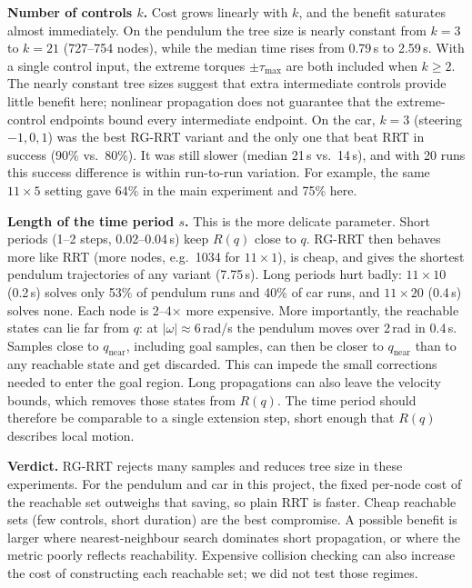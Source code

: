\documentclass[10pt,letterpaper]{article}
\begin{document}
\textbf{Number of controls $k$.} Cost grows linearly with $k$, and the benefit saturates almost immediately. On the pendulum the
tree size is nearly constant from $k=3$ to $k=21$ (727--754 nodes), while the median time rises from 0.79\,s to 2.59\,s. With a
single control input, the extreme torques $\pm\tau_{\max}$ are both included when $k\ge2$. The nearly constant tree sizes suggest that extra
intermediate controls provide little benefit here; nonlinear propagation does not guarantee that the extreme-control
endpoints bound every intermediate endpoint. On the car, $k=3$ (steering $-1,0,1$) was the best RG-RRT
variant and the only one that beat RRT in success (90\% vs.\ 80\%). It was still slower (median 21\,s vs.\ 14\,s), and with 20 runs
this success difference is within run-to-run variation. For example, the same $11\times5$ setting gave 64\% in the main
experiment and 75\% here.

\textbf{Length of the time period $s$.} This is the more delicate parameter. Short periods (1--2 steps, 0.02--0.04\,s) keep
$R(q)$ close to $q$. RG-RRT then behaves more like RRT (more nodes, e.g.\ 1034 for $11\times1$), is cheap, and gives the shortest
pendulum trajectories of any variant (7.75\,s). Long periods hurt badly: $11\times10$ (0.2\,s) solves only 53\% of pendulum runs
and 40\% of car runs, and $11\times20$ (0.4\,s) solves none. Each node is 2--4$\times$ more expensive. More importantly, the
reachable states can lie far from $q$: at $|\omega|\approx6$\,rad/s the pendulum moves over 2\,rad in 0.4\,s. Samples close to
$q_{\mathrm{near}}$, including goal samples, can then be closer to $q_{\mathrm{near}}$ than to any reachable state and get
discarded. This can impede the small corrections needed to enter the goal region. Long propagations can also leave the
velocity bounds, which removes those states from $R(q)$. The time period should therefore be comparable to a single
extension step, short enough that $R(q)$ describes local motion.

\textbf{Verdict.} RG-RRT rejects many samples and reduces tree size in these experiments. For the pendulum and car in this project, the
fixed per-node cost of the reachable set outweighs that saving, so plain RRT is faster. Cheap reachable sets (few controls,
short duration) are the best compromise. A possible benefit is larger where nearest-neighbour search dominates short propagation, or where the metric poorly
reflects reachability. Expensive collision checking can also increase the cost of constructing each reachable set; we
did not test those regimes.
\end{document}
